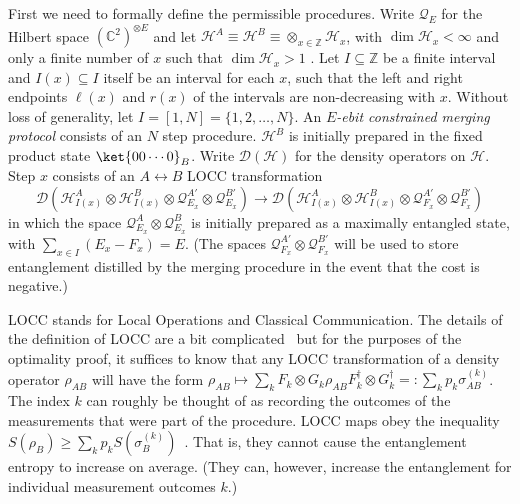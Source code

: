 \documentclass[12pt]{article}
\begin{document}
First we need to formally define the permissible procedures. Write $\mathcal{Q}_E$ for the Hilbert space $(\mathbb{C}^2)^{\otimes E}$ and let $\mathcal{H}^A \equiv \mathcal{H}^B \equiv \otimes_{x \in \mathbb{Z}} \mathcal{H}_x$, with $\dim \mathcal{H}_x < \infty$ and only a finite number of $x$ such that  $\dim \mathcal{H}_x > 1$ . Let $I \subseteq \mathbb{Z}$ be a finite interval and $I(x) \subseteq I$ itself be an interval for each $x$, such that the left and right endpoints $\ell(x)$ and $r(x)$ of the intervals are non-decreasing with $x$. Without loss of generality, let $I = [1,N] = \{1, 2, \ldots, N \}$. An \emph{$E$-ebit constrained merging protocol} consists of an $N$ step procedure. $\mathcal{H}^B$ is initially prepared in the fixed product state $\ket{00\cdots 0}_B$. Write $\mathcal{D}(\mathcal{H})$ for the density operators on $\mathcal{H}$. Step $x$ consists of an $A\leftrightarrow B$ LOCC transformation
\begin{equation}
\mathcal{D}( \mathcal{H}^A_{I(x)} \otimes \mathcal{H}_{I(x)}^B
	\otimes \mathcal{Q}_{E_x}^{A'} \otimes \mathcal{Q}_{E_x}^{B'} )
\longrightarrow
\mathcal{D}( \mathcal{H}^A_{I(x)} \otimes \mathcal{H}_{I(x)}^B
	\otimes \mathcal{Q}_{F_x}^{A'} \otimes \mathcal{Q}_{F_x}^{B'} )
\end{equation}
in which the space $\mathcal{Q}_{E_x}^A \otimes \mathcal{Q}_{E_x}^B$ is initially prepared as a maximally entangled state, with $\sum_{x \in I} (E_x - F_x)= E$. (The spaces $\mathcal{Q}_{F_x}^{A'} \otimes \mathcal{Q}_{F_x}^{B'}$ will be used to store entanglement distilled by the merging procedure in the event that the cost is negative.)

LOCC stands for Local Operations and Classical Communication.
The details of the definition of LOCC are a bit complicated~\cite{bennett1996mixed} but for the purposes of the optimality proof, it suffices to know that any LOCC transformation of a density operator $\rho_{AB}$ will have the form $\rho_{AB} \mapsto \sum_k F_k \otimes G_k \rho_{AB} F_k^\dagger \otimes G_k^\dagger =: \sum_k p_k \sigma^{(k)}_{AB}$. The index $k$ can roughly be thought of as recording the outcomes of the measurements that were part of the procedure. LOCC maps obey the inequality $S(\rho_B) \geq \sum_k p_k S( \sigma_B^{(k)} )$~\cite{bennett1996mixed}. That is, they cannot cause the entanglement entropy to increase on average. (They can, however, increase the entanglement for individual measurement outcomes $k$.)
\end{document}
